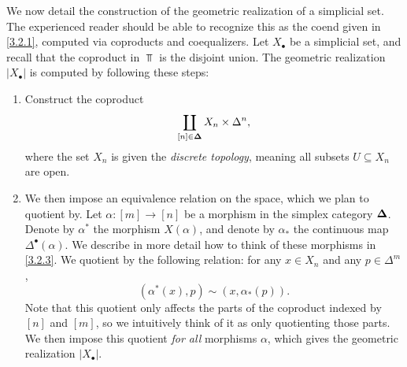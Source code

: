 \begin{construction}\label{3.2.2}
    We now detail the construction of the geometric realization of a simplicial set. The experienced reader should be able to recognize this as the coend given in \cref{3.2.1}, computed via coproducts and coequalizers. Let $X_\bullet$ be a simplicial set, and recall that the coproduct in $\Top$ is the disjoint union. The geometric realization $|X_\bullet|$ is computed by following these steps:
    \begin{enumerate}
        \item Construct the coproduct
        \[
        \coprod_{[n]\in\boldsymbol{\Delta}} X_n\times\Delta^n,
        \]
        where the set $X_n$ is given the \emph{discrete topology}, meaning all subsets $U\subseteq X_n$ are open.
        \item We then impose an equivalence relation on the space, which we plan to quotient by. Let $\alpha : [m]\to[n]$ be a morphism in the simplex category $\boldsymbol{\Delta}$. Denote by $\alpha^*$ the morphism $X(\alpha)$, and denote by $\alpha_*$ the continuous map $\Delta^\bullet(\alpha)$. We describe in more detail how to think of these morphisms in \cref{3.2.3}. We quotient by the following relation: for any $x\in X_n$ and any $p\in \Delta^m$,
        \[
        (\alpha^*(x),p)\sim (x,\alpha_*(p)).
        \]
        Note that this quotient only affects the parts of the coproduct indexed by $[n]$ and $[m]$, so we intuitively think of it as only quotienting those parts. We then impose this quotient \emph{for all} morphisms $\alpha$, which gives the geometric realization $|X_\bullet|$.
    \end{enumerate}
\end{construction}

